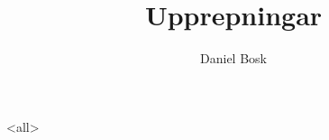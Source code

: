\documentclass[ignoreframetext]{beamer}
\begin{document}
\title{%
  Upprepningar
}
\author{Daniel Bosk}

\begin{frame}
  \maketitle
\end{frame}

\mode<all>

\mode*
%

\end{document}
